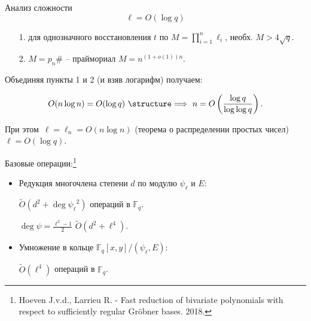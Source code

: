 \documentclass{beamer}
\begin{document}
\begin{frame}{Анализ сложности}
\[\ell = O(\log{q})\]
\ProofBegin
\begin{enumerate}
    \item[1.] для однозначного восстановления $t$ по $M = \prod\limits_{i=1}^{n} \ell_i$, необх. $M > 4 \sqrt{q}$.
    \item[2.] $M = p_n\#$ -- праймориал \MyImplies $M = n^{(1+o(1)) n}$.
\end{enumerate}

\vspace{0.5em}
Объединяя пункты 1 и 2 (и взяв логарифм) получаем:

\[O(n \log{n}) = O(\log{q}) \text{\MyImplies} n = O\left(\frac{\log{q}}{\log{\log{q}}}\right).\]

\vspace{1em}
При этом~$\ell = \ell_n = O(n \log{n})$ (теорема о распределении простых чисел) \MyImplies $\ell = O(\log{q})$.

\ProofEnd
\end{frame}

\begin{frame}

Базовые операции:\footnote{Hoeven J.v.d., Larrieu R. - Fast reduction of bivariate polynomials with respect to sufficiently regular Gröbner bases. 2018.}
\begin{itemize}
    \item Редукция многочлена степени $d$ по модулю $\psi_\ell$ и $E$:
    
    $\widetilde{O}(d^2 + \deg{\psi_\ell}^2)$ операций в $\mathbb{F}_q$.
    
    $\deg{\psi} = \frac{\ell^2 - 1}{2}$ \MyImplies $\widetilde{O}(d^2 + \ell^4)$.
    
    \item Умножение в кольце $\mathbb{F}_q[x, y] / (\psi_\ell, E)$:
    
    $\widetilde{O}(\ell^4)$ операций в $\mathbb{F}_q$.
\end{itemize}
\end{frame}
\end{document}
